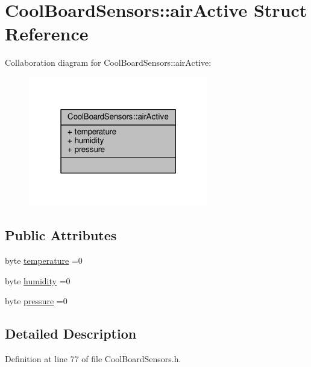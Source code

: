 \hypertarget{struct_cool_board_sensors_1_1air_active}{}\section{Cool\+Board\+Sensors\+:\+:air\+Active Struct Reference}
\label{struct_cool_board_sensors_1_1air_active}


Collaboration diagram for Cool\+Board\+Sensors\+:\+:air\+Active\+:\nopagebreak
\begin{figure}[H]
\begin{center}
\leavevmode
\includegraphics[width=223pt]{d5/d30/struct_cool_board_sensors_1_1air_active__coll__graph}
\end{center}
\end{figure}
\subsection*{Public Attributes}
\begin{DoxyCompactItemize}
\item 
byte \hyperlink{struct_cool_board_sensors_1_1air_active_a9a6633c426b0508e30ebc1832ec6d745}{temperature} =0
\item 
byte \hyperlink{struct_cool_board_sensors_1_1air_active_ae5740445054b27415e22f450576accb7}{humidity} =0
\item 
byte \hyperlink{struct_cool_board_sensors_1_1air_active_ab200826a70d1dc9945f5efb6b9c732ed}{pressure} =0
\end{DoxyCompactItemize}


\subsection{Detailed Description}


Definition at line 77 of file Cool\+Board\+Sensors.\+h.



